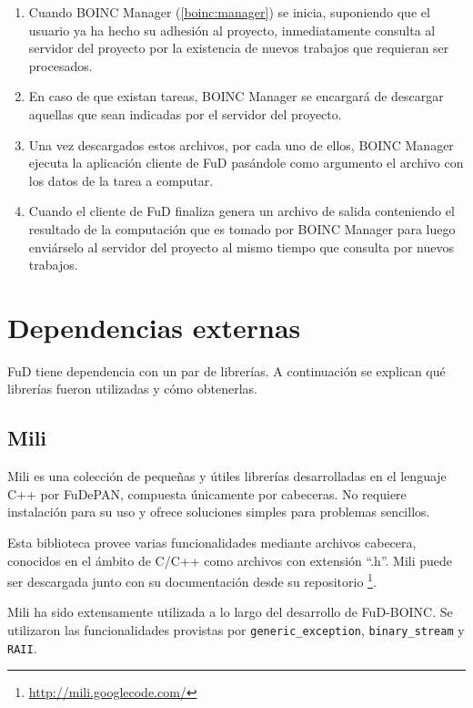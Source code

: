 \begin{enumerate}
\item Cuando BOINC Manager (\ref{boinc:manager}) se inicia, suponiendo que el usuario ya ha hecho su adhesión al proyecto, inmediatamente consulta al servidor del proyecto por la existencia de nuevos trabajos que requieran ser procesados.
\item En caso de que existan tareas, BOINC Manager se encargará de descargar aquellas que sean indicadas por el servidor del proyecto.
\item Una vez descargados estos archivos, por cada uno de ellos, BOINC Manager ejecuta la aplicación cliente de FuD pasándole como argumento el archivo con los datos de la tarea a computar.
\item Cuando el cliente de FuD finaliza genera un archivo de salida conteniendo el resultado de la computación que es tomado por BOINC Manager para luego enviárselo al servidor del proyecto al mismo tiempo que consulta por nuevos trabajos.
\end{enumerate}

\section{Dependencias externas}

FuD tiene dependencia con un par de librerías. A continuación se explican qué librerías fueron utilizadas y cómo obtenerlas.

\subsection{Mili}

Mili es una colección de pequeñas y útiles librerías desarrolladas en el lenguaje C++ por FuDePAN, compuesta únicamente por cabeceras. 
No requiere instalación para su uso y ofrece soluciones simples para problemas sencillos.

Esta biblioteca provee varias funcionalidades mediante archivos cabecera, conocidos en el ámbito de C/C++ como archivos con extensión “.h”.
Mili puede ser descargada junto con su documentación desde su repositorio \footnote{\url{http://mili.googlecode.com/}}.

Mili ha sido extensamente utilizada a lo largo del desarrollo de FuD-BOINC. Se utilizaron las funcionalidades provistas por \texttt{generic\_exception}, \texttt{binary\_stream} y \texttt{RAII}.

